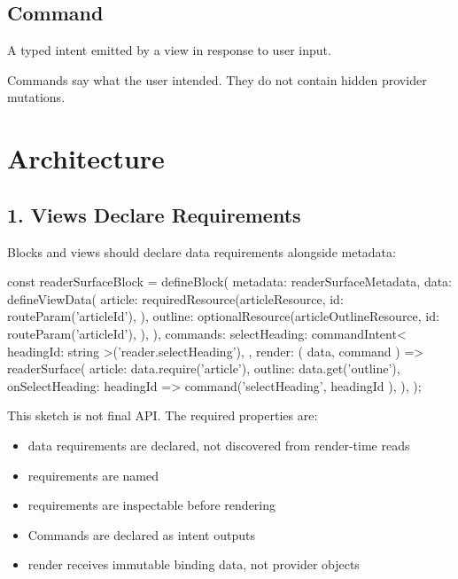 \subsection{Command}\label{record-132-command}

A typed intent emitted by a view in response to user input.

Commands say what the user intended. They do not contain hidden provider mutations.

\section{Architecture}\label{record-132-architecture}

\subsection{1. Views Declare Requirements}\label{record-132-views-declare-requirements}

Blocks and views should declare data requirements alongside metadata:

\begin{CodeBlock}
const readerSurfaceBlock = defineBlock({
  metadata: readerSurfaceMetadata,
  data: defineViewData({
    article: requiredResource(articleResource, {
      id: routeParam('articleId'),
    }),
    outline: optionalResource(articleOutlineResource, {
      id: routeParam('articleId'),
    }),
  }),
  commands: {
    selectHeading: commandIntent<{ headingId: string }>('reader.selectHeading'),
  },
  render: ({ data, command }) => readerSurface({
    article: data.require('article'),
    outline: data.get('outline'),
    onSelectHeading: headingId => command('selectHeading', { headingId }),
  }),
});
\end{CodeBlock}

This sketch is not final API. The required properties are:

\begin{itemize}
\tightlist
\item
  data requirements are declared, not discovered from render-time reads
\item
  requirements are named
\item
  requirements are inspectable before rendering
\item
  Commands are declared as intent outputs
\item
  render receives immutable binding data, not provider objects
\end{itemize}

